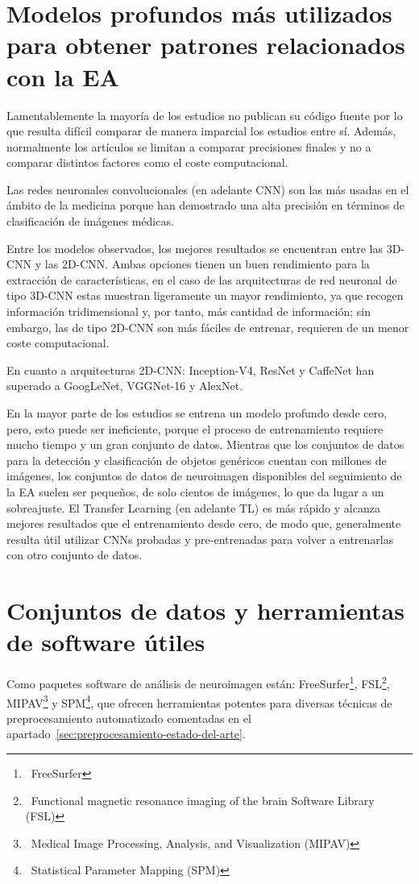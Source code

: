 \section{Modelos profundos más utilizados para obtener patrones relacionados con la EA}
\label{sec:modelos-profundos-estado-del-arte}
Lamentablemente la mayoría de los estudios no publican su código fuente por lo que resulta difícil comparar de manera
imparcial los estudios entre sí.
Además, normalmente los artículos se limitan a comparar precisiones finales y no a comparar distintos factores como el
coste computacional.

Las redes neuronales convolucionales (en adelante \Gls{CNN}) son las más usadas en el ámbito de la medicina porque han
demostrado una alta precisión en términos de clasificación de imágenes médicas.

Entre los modelos observados, los mejores resultados se encuentran entre las 3D-CNN y las 2D-CNN. Ambas opciones tienen
un buen rendimiento para la extracción de características, en el caso de las arquitecturas de red neuronal de tipo
3D-CNN estas muestran ligeramente un mayor rendimiento, ya que recogen información tridimensional y, por tanto, más
cantidad de información;
sin embargo, las de tipo 2D-CNN son más fáciles de entrenar, requieren de un menor coste computacional.

En cuanto a arquitecturas 2D-CNN: Inception-V4, ResNet y CaffeNet han superado a GoogLeNet, VGGNet-16 y AlexNet.

En la mayor parte de los estudios se entrena un modelo profundo desde cero, pero, esto puede ser ineficiente, porque
el proceso de entrenamiento requiere mucho tiempo y un gran conjunto de datos.
Mientras que los conjuntos de datos para la detección y clasificación de objetos genéricos cuentan con millones de
imágenes, los conjuntos de datos de neuroimagen disponibles del seguimiento de la EA suelen ser pequeños, de solo
cientos de imágenes, lo que da lugar a un sobreajuste.
El Transfer Learning (en adelante \Gls{TL}) es más rápido y alcanza mejores resultados que el entrenamiento desde cero, de
modo que, generalmente resulta útil utilizar CNNs probadas y pre-entrenadas para volver a entrenarlas con otro conjunto
de datos.

\section{Conjuntos de datos y herramientas de software útiles}\label{sec:datos-y-herramientas-estado-del-arte}
Como paquetes software de análisis de neuroimagen están:
FreeSurfer\footnote{~\cite{freeSurfer}{FreeSurfer}},
FSL\footnote{~\cite{fsl}{Functional magnetic resonance imaging of the brain Software Library (FSL)}},
MIPAV\footnote{~\cite{mipav}{Medical Image Processing, Analysis, and Visualization (MIPAV)}}
y SPM\footnote{~\cite{spm}{Statistical Parameter Mapping (SPM)}},
que ofrecen herramientas potentes para diversas técnicas de preprocesamiento automatizado comentadas en el
apartado~\ref{sec:preprocesamiento-estado-del-arte}.

